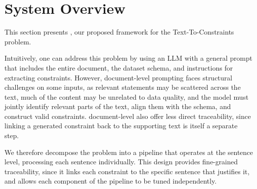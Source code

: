 \section{System Overview}
\label{sec:overview}


This section presents \system, our proposed framework for the Text-To-Constraints problem. 

Intuitively, one can address this problem by using an LLM with a general prompt that includes the entire document, the dataset schema, and instructions for extracting constraints. However, document-level prompting faces structural challenges on some inputs, as relevant statements may be scattered across the text, much of the content may be unrelated to data quality, and the model must jointly identify relevant parts of the text, align them with the schema, and construct valid constraints. 
\DIFdelbegin {}\DIFdelend \DIFaddbegin {}\DIFaddend document-level \DIFdelbegin {}\DIFdelend \DIFaddbegin {}\DIFaddend also offer less direct traceability, since linking a generated constraint back to the supporting text is itself a separate step.

We therefore \DIFdelbegin {}\DIFdelend decompose the problem into a pipeline that operates \DIFdelbegin {}\DIFdelend at the sentence level, processing each sentence individually. This design provides fine-grained traceability, since it links each constraint to the specific sentence that justifies it, and allows each component of the pipeline to be tuned independently.

